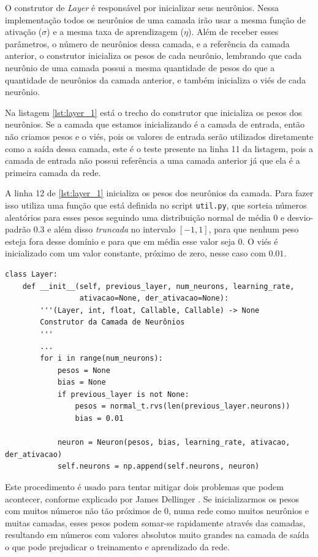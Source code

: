 O construtor de \emph{Layer} é responsável por inicializar seus neurônios. Nessa implementação todos os neurônios de uma camada irão usar a mesma função de ativação ($\sigma$) e a mesma taxa de aprendizagem ($\eta$). Além de receber esses parâmetros, o número de neurônios dessa camada, e a referência da camada anterior, o construtor inicializa os pesos de cada neurônio, lembrando que cada neurônio de uma camada possui a mesma quantidade de pesos do que a quantidade de neurônios da camada anterior, e também inicializa o viés de cada neurônio. 

Na listagem \ref{lst:layer_1} está o trecho do construtor que inicializa os pesos dos neurônios. Se a camada que estamos inicializando é a camada de entrada, então não criamos pesos e o viés, pois os valores de entrada serão utilizados diretamente como a saída dessa camada, este é o teste presente na linha 11 da listagem, pois a camada de entrada não possui referência a uma camada anterior já que ela é a primeira camada da rede.

A linha 12 de \ref{lst:layer_1} inicializa os pesos dos neurônios da camada. Para fazer isso utiliza uma função que está definida no script \texttt{util.py}, que sorteia números aleatórios para esses pesos seguindo uma distribuição normal de média $0$ e desvio-padrão $0.3$ e além disso \emph{truncada} no intervalo $[-1, 1]$, para que nenhum peso esteja fora desse domínio e para que em média esse valor seja $0$. O viés é inicializado com um valor constante, próximo de zero, nesse caso com $0.01$.
\newline
\estiloR
\begin{lstlisting}[caption={Trecho da classe \eng{Layer}}, label={lst:layer_1}, escapeinside={\%}]
class Layer:
    def __init__(self, previous_layer, num_neurons, learning_rate,
                 ativacao=None, der_ativacao=None):
        '''(Layer, int, float, Callable, Callable) -> None
        Construtor da Camada de Neurônios
        '''
        ...
        for i in range(num_neurons):
            pesos = None
            bias = None
            if previous_layer is not None:
                pesos = normal_t.rvs(len(previous_layer.neurons))
                bias = 0.01
            
            neuron = Neuron(pesos, bias, learning_rate, ativacao, der_ativacao)
            self.neurons = np.append(self.neurons, neuron)
\end{lstlisting}

Este procedimento é usado para tentar mitigar dois problemas que podem acontecer, conforme explicado por James Dellinger \citep{layers_1}. Se inicializarmos os pesos com muitos números não tão próximos de $0$, numa rede como muitos neurônios e muitas camadas, esses pesos podem somar-se rapidamente através das camadas, resultando em números com valores absolutos muito grandes na camada de saída o que pode prejudicar o treinamento e aprendizado da rede.

